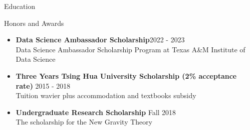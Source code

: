 \documentclass{resume}
\begin{document}
\begin{rSection}{Education}





\begin{rSection}{Honors and Awards}
    \begin{itemize}
        \item \textbf{Data Science Ambassador Scholarship}\hfill 2022 - 2023\\
        Data Science Ambassador Scholarship Program at Texas A\&M Institute of Data Science
        \item \textbf{Three Years Tsing Hua University Scholarship (2\% acceptance rate)} \hfill 2015 - 2018 \\
        Tuition wavier plus accommodation and textbooks subsidy
        \item \textbf{Undergraduate Research Scholarship} \hfill Fall 2018 \\
        The scholarship for the New Gravity Theory
    \end{itemize}
\end{rSection}



\end{rSection}
\end{document}
